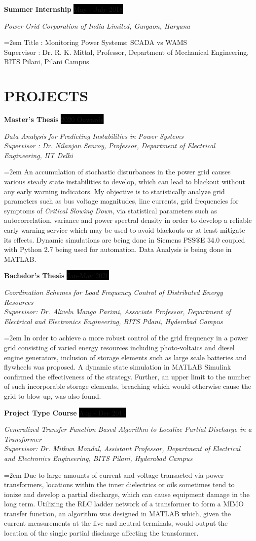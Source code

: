 \documentclass[paper=a4,fontsize=11pt]{scrartcl} %
\newcommand{\sepspace}{\vspace*{1em}}		%
\newcommand{\NewPart}[1]{\section*{\uppercase{#1}}}
\newcommand{\EducationEntry}[4]{
		\noindent \textbf{#1} \hfill      %
		\colorbox{Black}{%
			\parbox{6em}{%
			\hfill\color{White}#2}} \par  %
		\noindent \textit{#3} \par        %
		\noindent\hangindent=2em\hangafter=0 \small #4 %
		\normalsize \par}
\newcommand{\WorkEntry}[4]{				  %
		\noindent \textbf{#1} \hfill      %
		\colorbox{Black}{\color{White}#2} \par  %
		\noindent \textit{#3} \par              %
		\noindent\hangindent=2em\hangafter=0 \small #4 %
		\normalsize \par}
\begin{document}
\WorkEntry{Summer Internship}{May - July 2018}{Power Grid Corporation of India Limited, Gurgaon, Haryana}{Title : Monitoring Power Systems: SCADA vs WAMS\\Supervisor : Dr. R. K. Mittal, Professor, Department of Mechanical Engineering, BITS Pilani, Pilani Campus}

\sepspace
\sepspace
\sepspace
\sepspace
\sepspace

\NewPart{Projects}{}

\WorkEntry{Master's Thesis}{2020 Onwards}{Data Analysis for Predicting Instabilities in Power Systems\\ Supervisor : Dr. Nilanjan Senroy, Professor, Department of Electrical Engineering, IIT Delhi}{An accumulation of stochastic disturbances in the power grid causes various steady state instabilities to develop, which can lead to blackout without any early warning indicators. My objective is to statistically analyze grid parameters such as bus voltage magnitudes, line currents, grid frequencies for symptoms of \textit{Critical Slowing Down}, via statistical parameters such as autocorrelation, variance and power spectral density in order to develop a reliable early warning service which may be used to avoid blackouts or at least mitigate its effects. Dynamic simulations are being done in Siemens PSS®E 34.0 coupled with Python 2.7 being used for automation. Data Analysis is being done in MATLAB.}
\sepspace


\WorkEntry{Bachelor's Thesis}{Jan-May 2020}{Coordination Schemes for Load Frequency Control of Distributed Energy Resources\\ Supervisor: Dr. Alivelu Manga Parimi, Associate Professor, Department of Electrical and Electronics Engineering, BITS Pilani, Hyderabad Campus}{In order to achieve a more robust control of the grid frequency in a power grid consisting of varied energy resources including photo-voltaics and diesel engine generators, inclusion of storage elements such as large scale batteries and flywheels was proposed. A dynamic state simulation in MATLAB Simulink confirmed the effectiveness of the strategy. Further, an upper limit to the number of such incorporable storage elements, breaching which would otherwise cause the grid to blow up, was also found.}
\sepspace

\WorkEntry{Project Type Course}{Aug - Dec 2019}{Generalized Transfer Function Based Algorithm to Localize Partial Discharge in a Transformer \\ Supervisor: Dr. Mithun Mondal, Assistant Professor, Department of Electrical and Electronics Engineering, BITS Pilani, Hyderabad Campus}{Due to large amounts of current and voltage transacted via power transformers, locations within the inner dielectrics or oils sometimes tend to ionize and develop a partial discharge, which can cause equipment damage in the long term. Utilizing the RLC ladder network of a transformer to form a MIMO transfer function, an algorithm was designed in MATLAB which, given the current measurements at the live and neutral terminals, would output the location of the single partial discharge affecting the transformer.}
\end{document}
